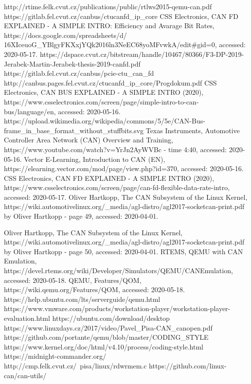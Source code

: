 \documentclass{ctuthesis}
\begin{document}
 
\renewcommand\bibname{References}
\begin{thebibliography}{1}
 http://rtime.felk.cvut.cz/publications/public/rtlws2015-qemu-can.pdf
 https://gitlab.fel.cvut.cz/canbus/ctucanfd\_ip\_core
 CSS Electronics, CAN FD EXPLAINED - A SIMPLE INTRO: Efficiency and Avarage Bit Rates, https://docs.google.com/spreadsheets/d/\\16XIceuoG\_YBlgyFKXxjYQk2016ln3NeEC68yoMFvwkA/edit\#gid=0, accessed: 2020-05-17.
 https://dspace.cvut.cz/bitstream/handle/10467/80366/F3-DP-2019-Jerabek-Martin-Jerabek-thesis-2019-canfd.pdf
 https://gitlab.fel.cvut.cz/canbus/pcie-ctu\_can\_fd
 http://canbus.pages.fel.cvut.cz/ctucanfd\_ip\_core/Progdokum.pdf
 CSS Electronics, CAN BUS EXPLAINED - A SIMPLE INTRO (2020), https://www.csselectronics.com/screen/page/simple-intro-to-can-bus/language/en, accessed: 2020-05-16.
 https://upload.wikimedia.org/wikipedia/commons/5/5e/CAN-Bus-frame\_in\_base\_format\_without\_stuffbits.svg
 Texas Instruments, Automotive Controller Area Network (CAN) Overview and Training, https://www.youtube.com/watch?v=YrJn2AyWVBc - time 4:40, accessed: 2020-05-16.
 Vector E-Learning, Introduction to CAN (EN), https://elearning.vector.com/mod/page/view.php?id=370, accessed: 2020-05-16.
 CSS Electronics, CAN FD EXPLAINED - A SIMPLE INTRO (2020), https://www.csselectronics.com/screen/page/can-fd-flexible-data-rate-intro, accessed: 2020-05-17.
 Oliver Hartkopp, The CAN Subsystem of the Linux Kernel, https://wiki.automotivelinux.org/\_media/agl-distro/agl2017-socketcan-print.pdf by Oliver Hartkopp - page 49, accessed: 2020-04-01.

 Oliver Hartkopp, The CAN Subsystem of the Linux Kernel, https://wiki.automotivelinux.org/\_media/agl-distro/agl2017-socketcan-print.pdf by Oliver Hartkopp - page 50, accessed: 2020-04-01.
 RTEMS, QEMU with CAN Emulation, https://devel.rtems.org/wiki/Developer/Simulators/QEMU/CANEmulation, accessed: 2020-05-18.
 QEMU, Features/QOM, https://wiki.qemu.org/Features/QOM, accessed: 2020-05-18.
 https://help.ubuntu.com/lts/serverguide/qemu.html
 https://www.vmware.com/products/workstation-player/workstation-player-evaluation.html
 https://ubuntu.com/download/desktop
 https://www.linuxdays.cz/2017/video/Pavel\_Pisa-CAN\_canopen.pdf
 https://github.com/portante/qemu/blob/master/CODING\_STYLE
 https://www.kernel.org/doc/html/v4.10/process/coding-style.html
 https://midnight-commander.org/
 http://cmp.felk.cvut.cz/~pisa/linux/rdwrmem.c
 https://github.com/linux-can/can-utils/
\end{thebibliography}
 
\end{document}
